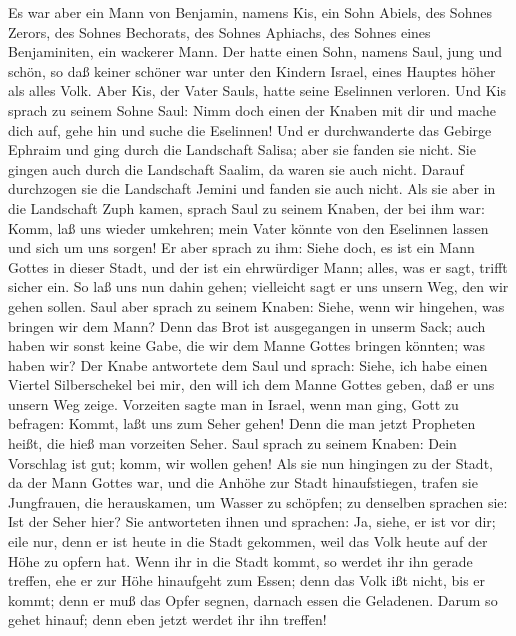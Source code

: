  Es war aber ein Mann von Benjamin, namens Kis, ein Sohn
Abiels, des Sohnes Zerors, des Sohnes Bechorats, des Sohnes Aphiachs,
des Sohnes eines Benjaminiten, ein wackerer Mann.  Der
hatte einen Sohn, namens Saul, jung und schön, so daß keiner schöner war
unter den Kindern Israel, eines Hauptes höher als alles Volk.
 Aber Kis, der Vater Sauls, hatte seine Eselinnen
verloren. Und Kis sprach zu seinem Sohne Saul: Nimm doch einen der
Knaben mit dir und mache dich auf, gehe hin und suche die Eselinnen!
 Und er durchwanderte das Gebirge Ephraim und ging durch
die Landschaft Salisa; aber sie fanden sie nicht. Sie gingen auch durch
die Landschaft Saalim, da waren sie auch nicht. Darauf durchzogen sie
die Landschaft Jemini und fanden sie auch nicht.  Als sie
aber in die Landschaft Zuph kamen, sprach Saul zu seinem Knaben, der bei
ihm war: Komm, laß uns wieder umkehren; mein Vater könnte von den
Eselinnen lassen und sich um uns sorgen!  Er aber sprach
zu ihm: Siehe doch, es ist ein Mann Gottes in dieser Stadt, und der ist
ein ehrwürdiger Mann; alles, was er sagt, trifft sicher ein. So laß uns
nun dahin gehen; vielleicht sagt er uns unsern Weg, den wir gehen
sollen.  Saul aber sprach zu seinem Knaben: Siehe, wenn
wir hingehen, was bringen wir dem Mann? Denn das Brot ist ausgegangen in
unserm Sack; auch haben wir sonst keine Gabe, die wir dem Manne Gottes
bringen könnten; was haben wir?  Der Knabe antwortete dem
Saul und sprach: Siehe, ich habe einen Viertel Silberschekel bei mir,
den will ich dem Manne Gottes geben, daß er uns unsern Weg zeige.
 Vorzeiten sagte man in Israel, wenn man ging, Gott zu
befragen: Kommt, laßt uns zum Seher gehen! Denn die man jetzt Propheten
heißt, die hieß man vorzeiten Seher.  Saul sprach zu
seinem Knaben: Dein Vorschlag ist gut; komm, wir wollen gehen!
 Als sie nun hingingen zu der Stadt, da der Mann Gottes
war, und die Anhöhe zur Stadt hinaufstiegen, trafen sie Jungfrauen, die
herauskamen, um Wasser zu schöpfen; zu denselben sprachen sie: Ist der
Seher hier?  Sie antworteten ihnen und sprachen: Ja,
siehe, er ist vor dir; eile nur, denn er ist heute in die Stadt
gekommen, weil das Volk heute auf der Höhe zu opfern hat.
 Wenn ihr in die Stadt kommt, so werdet ihr ihn gerade
treffen, ehe er zur Höhe hinaufgeht zum Essen; denn das Volk ißt nicht,
bis er kommt; denn er muß das Opfer segnen, darnach essen die Geladenen.
Darum so gehet hinauf; denn eben jetzt werdet ihr ihn treffen!
